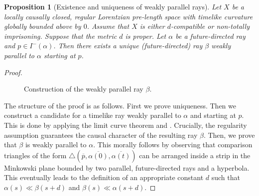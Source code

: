 \documentclass[11pt,reqno]{amsart}
\theoremstyle{definition}
\newcommand{\Cref}[1]{\zcref[S]{#1}}
\theoremstyle{definition}
\theoremstyle{plain}
\newtheorem{pop}[dfn]{Proposition}
\theoremstyle{remark}
\newcommand{\LpLS}{Lorentzian pre-length space }
\begin{document}
\begin{pop}[Existence and uniqueness of weakly parallel rays]
\label{pop: existence and uniqueness of weakly parallel rays}
Let $X$ be a locally causally closed, regular \LpLS with timelike curvature globally bounded above by $0$. 
Assume that $X$ is either $d$-compatible or non-totally imprisoning. 
Suppose that the metric $d$ is proper. 
Let $\alpha$ be a future-directed ray and $p\in I^-(\alpha)$. 
Then there exists a unique (future-directed) ray $\beta$ weakly parallel to $\alpha$ starting at $p$. 
\end{pop}
\begin{proof}
\begin{figure}
\centering
{}
\caption{Construction of the weakly parallel ray $\beta$.}
\label{fig:constructingbeta}
\end{figure}
The structure of the proof is as follows. First we prove uniqueness. 
Then we construct a candidate for a timelike ray weakly parallel to $\alpha$ and starting at $p$. This is done by applying the limit curve theorem and \Cref{lem:conv_d_vs_tau}. Crucially, the regularity assumption guarantees the causal character of the resulting ray $\beta$. Then, we prove that $\beta$ is weakly parallel to $\alpha$. This morally follows by observing that comparison triangles of the form $\triangle (\overline{p},\overline{\alpha(0)},\overline{\alpha(t)})$ can be arranged inside a strip in the Minkowski plane bounded by two parallel, future-directed rays and a hyperbola. This eventually leads to the definition of an appropriate constant $d$ such that $\alpha(s)\ll \beta(s+d)$ and $\beta(s)\ll \alpha(s+d)$. 


\end{proof}
\end{document}
